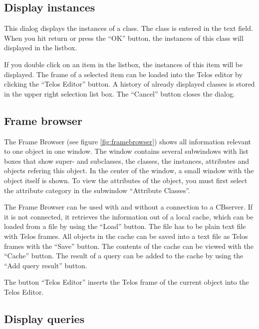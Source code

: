 
\subsection{Display instances}
\label{sec:display_instances}

This dialog displays the instances of a class. The class is entered in the
text field. When you hit return or press the ``OK'' button, the instances of this
class will displayed in the listbox.

If you double click on an item in the listbox, the instances of this item
will be displayed. The frame of a selected item can be loaded into the Telos
editor by clicking the ``Telos Editor'' button.
A history of already displayed classes is stored in the upper right
selection list box. The ``Cancel'' button closes the dialog.

\subsection{Frame browser}
\label{sec:frame_browser}

The Frame Browser (see figure \ref{fig:framebrowser}) shows all information relevant to one object in one
window. The window contains several subwindows with list boxes that show
super- and subclasses, the classes, the instances, attributes and
objects refering this object. In the center of the window, a small
window with the object itself is shown.
To view the attributes of the object, you must first select the
attribute category in the subwindow ``Attribute Classes''.



The Frame Browser can be used with and without a connection to
a CBserver. If it is not connected, it retrieves the
information out of a local cache, which can be loaded from a file
by using the ``Load'' button. The file has to be plain text file
with Telos frames. All objects in the cache can be saved into a text file
as Telos frames with the ``Save''
button. The contents of the cache can be viewed
with the ``Cache'' button. The result of a query can be added to
the cache by using the ``Add query result'' button.

The button ``Telos Editor'' inserts the Telos frame of the current
object into the Telos Editor.

\subsection{Display queries}
\label{sec:display_queries}

